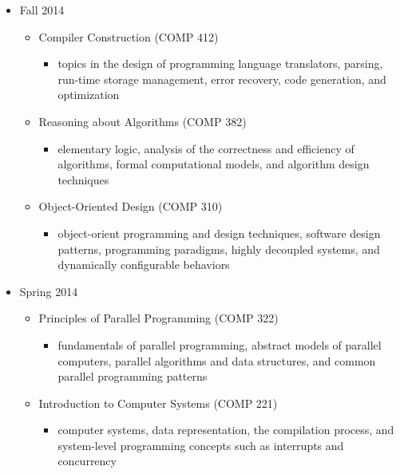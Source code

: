 \documentclass[a4paper]{article}
\begin{document}
\begin{itemize}

    \item{Fall 2014}
    \begin{itemize}

        \item{Compiler Construction (COMP 412)}
        \begin{itemize}
            \item{topics in the design of programming language translators, parsing, run-time storage management, error recovery, code generation, and optimization}
        \end{itemize}

        \item{Reasoning about Algorithms (COMP 382)}
        \begin{itemize}
            \item{elementary logic, analysis of the correctness and efficiency of algorithms, formal computational models, and algorithm design techniques}
        \end{itemize}

        \item{Object-Oriented Design (COMP 310)}
        \begin{itemize}
            \item{object-orient programming and design techniques, software design patterns, programming paradigms, highly decoupled systems, and dynamically configurable behaviors}
        \end{itemize}

    \end{itemize}

    \item{Spring 2014}
    \begin{itemize}

        \item{Principles of Parallel Programming (COMP 322)}
        \begin{itemize}
            \item{fundamentals of parallel programming, abstract models of parallel computers, parallel algorithms and data structures, and common parallel programming patterns}
        \end{itemize}

        \item{Introduction to Computer Systems (COMP 221)}
        \begin{itemize}
            \item{computer systems, data representation, the compilation process, and system-level programming concepts such as interrupts and concurrency}
        \end{itemize}


\end{itemize}
\end{itemize}
\end{document}
